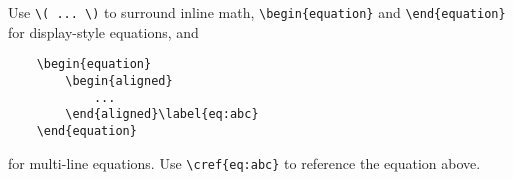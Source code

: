 Use \verb|\( ... \)| to surround inline math,
\verb|\begin{equation}| and \verb|\end{equation}|
for display-style equations,
and
\begin{verbatim}
    \begin{equation}
        \begin{aligned}
            ...
        \end{aligned}\label{eq:abc}
    \end{equation}
\end{verbatim}
for multi-line equations.
Use \verb|\cref{eq:abc}| to reference the equation above.
